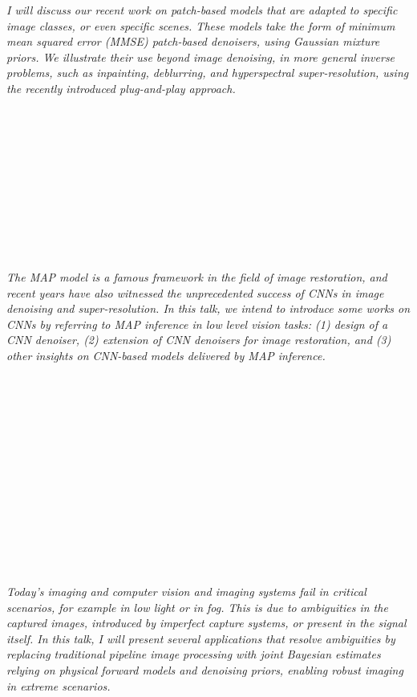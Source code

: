 \begin{multicols}{2}
      \textit{I will discuss our recent work on patch-based models that are adapted to specific image classes, or even specific scenes. These models take the form of minimum mean squared error (MMSE) patch-based denoisers, using Gaussian mixture priors. We illustrate their use beyond image denoising, in more general inverse problems, such as inpainting, deblurring, and hyperspectral super-resolution, using the recently introduced plug-and-play approach.}\\
\\ 
        \\
        \\\\
        \\
        \\\\
        \\
        \\\\
\\
      \textit{The MAP model is a famous framework in the field of image restoration, and recent years have also witnessed the unprecedented success of CNNs in image denoising and super-resolution. In this talk, we intend to introduce some works on CNNs by referring to MAP inference in low level vision tasks: (1) design of a CNN denoiser, (2) extension of CNN denoisers for image restoration, and (3) other insights on CNN-based models delivered by MAP inference. }\\
\\ 
        \\
        \\\\
        \\
        \\\\
        \\
        \\\\
        \\
        \\\\
\\
      \textit{Today's imaging and computer vision and imaging systems fail in critical scenarios, for example in low light or in fog. This is due to ambiguities in the captured images, introduced by imperfect capture systems, or present in the signal itself. In this talk, I will present several applications that resolve ambiguities by replacing traditional pipeline image processing with joint Bayesian estimates relying on physical forward models and denoising priors, enabling robust imaging in extreme scenarios.}\\

\end{multicols}
